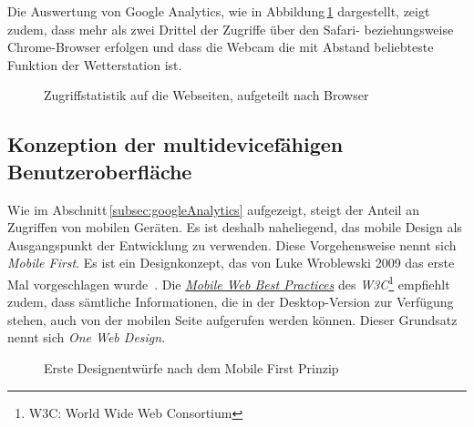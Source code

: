 \noindent
Die Auswertung von Google Analytics, wie in Abbildung\,\ref{img:google_browser} dargestellt, zeigt zudem, dass mehr als zwei Drittel der Zugriffe über den Safari- beziehungsweise Chrome-Browser erfolgen und dass die Webcam die mit Abstand beliebteste Funktion der Wetterstation ist.

\begin{figure}[htb!]
	\centering
	\caption{Zugriffstatistik auf die Webseiten, aufgeteilt nach Browser}
	\label{img:google_browser}
\end{figure}



\subsection{Konzeption der multidevicefähigen Benutzeroberfläche}
Wie im Abschnitt\,\ref{subsec:googleAnalytics} aufgezeigt, steigt der Anteil an Zugriffen von mobilen Geräten. Es ist deshalb naheliegend, das mobile Design als Ausgangspunkt der Entwicklung zu verwenden. Diese Vorgehensweise nennt sich \emph{Mobile First}. Es ist ein Designkonzept, das von Luke Wroblewski 2009 das erste Mal vorgeschlagen wurde~\cite{LuWrmf}. Die \href{https://www.w3.org/TR/mobile-bp}{\emph{ Mobile Web Best Practices}} des \emph{W3C}\footnote{W3C: World Wide Web Consortium} empfiehlt zudem, dass sämtliche Informationen, die in der Desktop-Version zur Verfügung stehen, auch von der mobilen Seite aufgerufen werden können. Dieser Grundsatz nennt sich \emph{One Web Design}.

\begin{figure}[htb!]
	\centering
	\caption{Erste Designentwürfe nach dem Mobile First Prinzip}
	\label{img:scribbles}
\end{figure}


